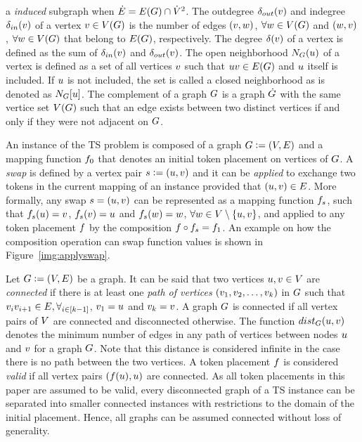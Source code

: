 \documentclass[msc]{ppgccufmg}    %
\begin{document}
a \textit{induced} subgraph when $\dot{E} = E(G) \cap \dot{V}^{2}$.
The outdegree $\delta_{out}(v)$ and indegree $\delta_{in}(v)$ of a vertex 
$v \in V(G)$ is the number of edges $(v, 
w)$, $\forall w \in V(G)$ and $(w, 
v)$, $\forall w \in V(G)$ that belong to $E(G)$, 
respectively.
The degree $\delta(v)$ of a vertex is defined as the sum of 
$\delta_{in}(v)$ and $\delta_{out}(v)$.
The open neighborhood $N_{G}(u)$ of a vertex is defined 
as a set of all vertices $v$ such that $uv \in E(G)$ and
$u$ itself is included.
If $u$ is not included, the set is called a closed neighborhood as is
denoted as $N_{G}[u]$.
The complement of a graph $G$ is a graph $\dot{G}$ with the same
vertice set $V(G)$ such that an edge exists between two distinct 
vertices if and only if they were not adjacent on $G$.


An instance of the TS problem is composed of a graph $G \vcentcolon= (V,E)$ and a mapping function $f_{0}$ that denotes an initial 
token placement on vertices of $G$.
A \textit{swap} is defined by a vertex pair $s \vcentcolon= (u,
v)$ and it can be \textit{applied} to exchange two tokens in the current 
mapping of an instance provided that $(u,
v) \in E$.
More formally, any swap $s = (u,v)$ can be 
represented as a mapping function $f_s$, such that $f_s(u) = v$, $f_s(v) = u$ and $f_s(w) = w$, $\forall w \in V\setminus \{u,v\}$, and 
applied to any token placement $f$ by the composition $f\circ
f_s = f_1$.
An example on how the composition operation can swap function values is shown
in Figure~\ref{img:applyswap}.

Let $G \vcentcolon= (V,E)$ be a graph.
It can be said that two vertices $u, v \in V$ are 
\textit{connected} if there is at least one \textit{path of vertices} 
$(v_1, v_2, \ldots, v_k)$ in $G$ such that 
$v_{i}v_{i+1} \in E, \forall_{i\in[k-1]}$, 
$v_{1} = u$ and $v_{k} = v$.
A graph $G$ is connected if all vertex pairs of $V$ are 
connected and disconnected otherwise.
The function $dist_{G}(u, v)$ denotes the minimum number of edges in 
any path of vertices between nodes $u$ and $v$ for a graph 
$G$.
Note that this distance is considered infinite in the case there is no 
path between the two vertices.
A token placement $f$ is considered \textit{valid} if all vertex pairs
$(f(u), u)$ are connected.
As all token placements in this paper are assumed to be valid, every 
disconnected graph of a TS instance can be separated into smaller connected 
instances with restrictions to the domain of the initial placement.
Hence, all graphs can be assumed connected without loss of generality.
\end{document}
